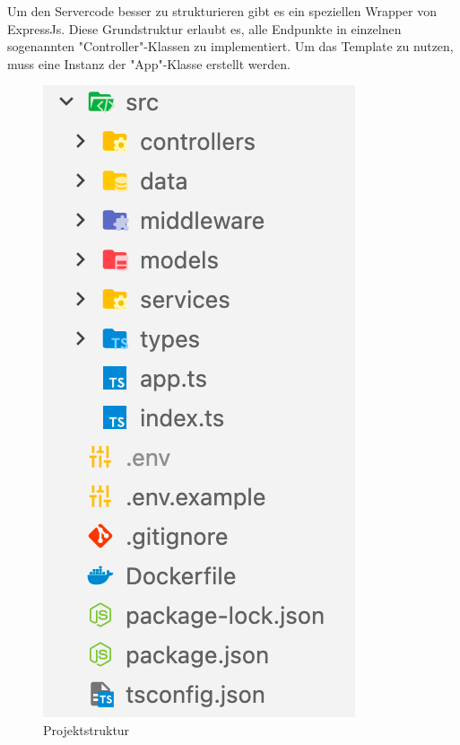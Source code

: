 
Um den Servercode besser zu strukturieren gibt es ein speziellen Wrapper von ExpressJs. Diese Grundstruktur erlaubt es, alle Endpunkte in einzelnen sogenannten "Controller"-Klassen zu implementiert. Um das Template zu nutzen, muss eine Instanz der "App"-Klasse erstellt werden.

\begin{figure}[H]
    \centering
    \includegraphics{media/APITemplate/ProjectStructure.png}
    \caption{Projektstruktur}
\end{figure}







